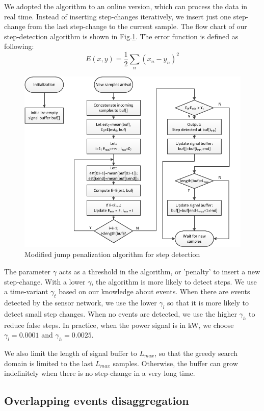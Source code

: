 We adopted the algorithm to an online version, which can process the data in real time.  Instead of inserting step-changes iteratively, we insert just one step-change from the last step-change to the current sample. The flow chart of our step-detection algorithm is shown in Fig.\ref{fig:pwc}. The error function is defined as following: \[E(x,y) = \frac{1}{2} \sum_n \left(x_n - y_n\right)^2\]

\begin{figure}[htb]
  \centering
  \includegraphics[width=\textwidth]{figures/pwc}
  \caption{Modified jump penalization algorithm for step detection}
  \label{fig:pwc}
\end{figure}

The parameter $\gamma$ acts as a threshold in the algorithm, or 'penalty' to insert a new step-change. With a lower $\gamma$, the algorithm is more likely to detect steps. We use a time-variant $\gamma_t$ based on our knowledge about events. When there are events detected by the sensor network, we use the lower $\gamma_l$ so that it is more likely to detect small step changes. When no events are detected, we use the higher $\gamma_h$ to reduce false steps. In practice, when the power signal is in kW, we choose $\gamma_l = 0.0001$ and $\gamma_h=0.0025$. 

We also limit the length of signal buffer to $L_{max}$, so that the greedy search domain is limited to the last $L_{max}$ samples. Otherwise, the buffer can grow indefinitely when there is no step-change in a very long time. 

\subsection{Overlapping events disaggregation}


